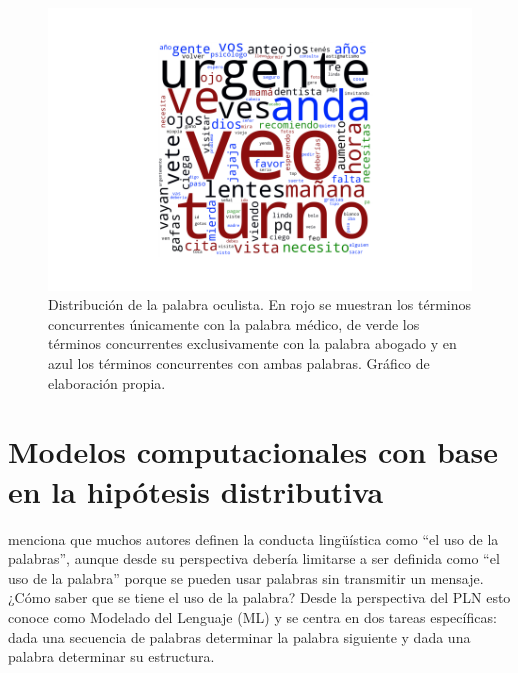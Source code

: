 \begin{figure}[h]
	\centering
	\includegraphics[width=0.7\linewidth]{img/example_structure}
	\caption{Distribución de la palabra oculista. En rojo se muestran los términos concurrentes únicamente con la palabra médico, de verde los términos concurrentes exclusivamente con la palabra abogado y en azul los términos concurrentes con ambas palabras. Gráfico de elaboración propia.}
	\label{fig:example_structure}
\end{figure}


\section{Modelos computacionales con base en la hipótesis distributiva}
\label{sec:sec22}

\cite{otero1975terminologia} menciona que muchos autores definen la conducta lingüística como ``el uso de la palabras'', aunque desde su perspectiva debería limitarse a ser definida como ``el uso de la palabra'' porque se pueden usar palabras sin transmitir un mensaje. ¿Cómo saber que se tiene el uso de la palabra? Desde la perspectiva del PLN esto conoce como Modelado del Lenguaje (ML) y se centra en dos tareas específicas: dada una secuencia de palabras determinar la palabra siguiente y dada una palabra determinar su estructura.

